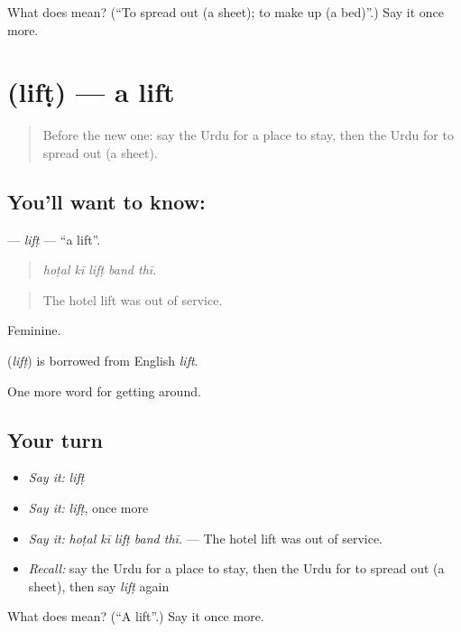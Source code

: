 \begin{tcolorbox}[breakable,colback=teal!4,colframe=teal!35!black,title={Before you move on}]
What does  mean? (\textquotedblleft{}To spread out (a sheet); to make up (a bed)\textquotedblright{}.) Say it once more.
\end{tcolorbox}
\section[\texorpdfstring{\ur{لفٹ} (lifṭ)}{لفٹ (lifṭ)}]{ (lifṭ) — a lift}

\label{lesson:UR-C403-lift}



\begin{quote}
Before the new one: say the Urdu for a place to stay, then the Urdu for to spread out (a sheet).
\end{quote}

\subsection*{You'll want to know: }
\textbf{} — \emph{lifṭ} — \textquotedblleft{}a lift\textquotedblright{}.

\begin{quote}
    
\end{quote}

\begin{quote}
\emph{hoṭal kī lifṭ band thī.}
\end{quote}

\begin{quote}
The hotel lift was out of service.
\end{quote}

Feminine.

\begin{cousinweb}
\textbf{} (\emph{lifṭ}) is borrowed from English \emph{lift}.
\end{cousinweb}

\begin{grammarlens}[title={What you've built}]
One more word for getting around.
\end{grammarlens}

\subsection*{Your turn}
\begin{itemize}
\raggedright
  \item \emph{Say it:} \emph{lifṭ}
  \item \emph{Say it:} \emph{lifṭ}, once more
  \item \emph{Say it:} \emph{hoṭal kī lifṭ band thī.} — The hotel lift was out of service.
  \item \emph{Recall:} say the Urdu for a place to stay, then the Urdu for to spread out (a sheet), then say \emph{lifṭ} again
\end{itemize}

\begin{tcolorbox}[breakable,colback=teal!4,colframe=teal!35!black,title={Before you move on}]
What does  mean? (\textquotedblleft{}A lift\textquotedblright{}.) Say it once more.
\end{tcolorbox}
